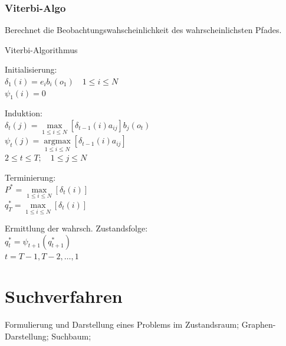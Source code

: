 \documentclass[german,color,6pt]{latex4ei/latex4ei_sheet}
\begin{document}
\begin{sectionbox}
\subsubsection{Viterbi-Algo}
Berechnet die Beobachtungswahscheinlichkeit des wahrscheinlichsten Pfades.
\begin{cookbox}{Viterbi-Algorithmus}
	\item Initialisierung: \\
		$\delta_1 (i) = e_i b_i (o_1) \quad 1 \leq i \leq N $\\
		$\psi _1 (i) = 0$\\
	\item Induktion: \\
		$\delta_t (j) = \max\limits_{1 \leq i \leq N }\left[ \delta_{t-1} (i) a_{ij} \right] b_j (o_t)$\\
		$\psi_t(j) = \underset{1 \leq i \leq N}{\operatorname{argmax}} \left[\delta_{t-1}(i) a_{ij} \right]$\\
		$2 \leq t \leq T; \quad 1 \leq j \leq N$\\
	\item Terminierung: \\
		$P^* = \max\limits_{1 \leq i \leq N} [\delta_t(i)]$\\
		$q_T^* = \max\limits_{1 \leq i \leq N} [\delta_t(i)]$\\
	\item Ermittlung der wahrsch. Zustandsfolge:\\
		$q_t^* = \psi_{t+1}(q^*_{t+1})$\\
		$t= T-1, T-2, \dots , 1$\\
\end{cookbox}
\end{sectionbox}

\columnbreak


\section{Suchverfahren}
\begin{symbolbox}
	Formulierung und Darstellung eines Problems im Zustandsraum; Graphen-Darstellung; Suchbaum;
\end{symbolbox}
\end{document}
